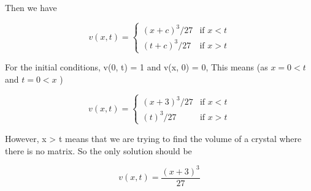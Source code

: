 \documentclass{article}
\begin{document}
Then we have

\begin{equation*}
v(x,t) = 
\begin{cases}
{(x+c)^3}/{27} & \text{if $x < t$}\\
{(t+c)^3}/{27} & \text{if $x > t$}
\end{cases}
\end{equation*}

For the initial conditions, v(0, t) = 1  and v(x, 0) = 0, This means (as $x = 0 < t$ and $t = 0 < x$ )

\begin{equation*}
v(x,t) = 
\begin{cases}
{(x+3)^3}/{27} & \text{if $x < t$}\\
{(t)^3}/{27} & \text{if $x > t$}
\end{cases}
\end{equation*}

However, x > t means that we are trying to find the volume of a crystal where there is no matrix. So the only solution should be 

$$v(x, t) = \frac{(x+3)^3}{27}$$
\end{document}
